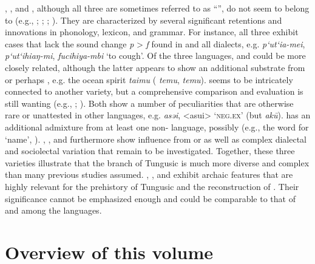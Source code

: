 \documentclass[output=paper,colorlinks,citecolor=brown]{langscibook}
\begin{document}
, , and , although all three are sometimes referred to as “”, do not seem to belong to  (e.g., \citealt{MuYejun1987}; \citealt{Hölzl2017a}; \citealt{HölzlHölzl2019a}; ). They are characterized by several significant retentions and innovations in phonology, lexicon, and grammar. For instance, all three exhibit cases that lack the sound change \textit{p} > \textit{f} found in  and all  dialects, e.g.  \textit{p‘ut‘ia-mei},  \textit{p‘ut‘ihiaŋ-mi},  \textit{fucihiya-mbi} ‘to cough’. Of the three languages,  and  could be more closely related, although the latter appears to show an additional substrate from  or perhaps , e.g. the ocean spirit \textit{taimu}  ( \textit{temu},  \textit{temu}).  seems to be intricately connected to another  variety, but a comprehensive comparison and evaluation is still wanting (e.g., \citealt{Kiyose1977, Kiyose2000}; \citealt{MuYejun1987}). Both show a number of peculiarities that are otherwise rare or unattested in other  languages, e.g.  \textit{asəi},  <asui>  ‘\textsc{neg.ex}’ (but  \textit{akū}).  has an additional admixture from at least one non- language, possibly  (e.g., the word for ‘name’, ). , , and  furthermore show influence from  or  as well as complex dialectal and sociolectal variation that remain to be investigated. Together, these three varieties illustrate that the  branch of Tungusic is much more diverse and complex than many previous studies assumed. , , and  exhibit archaic features that are highly relevant for the prehistory of Tungusic and the reconstruction of . Their significance cannot be emphasized enough and could be comparable to that of  and  among the  languages.


\section{Overview of this volume}
\end{document}
